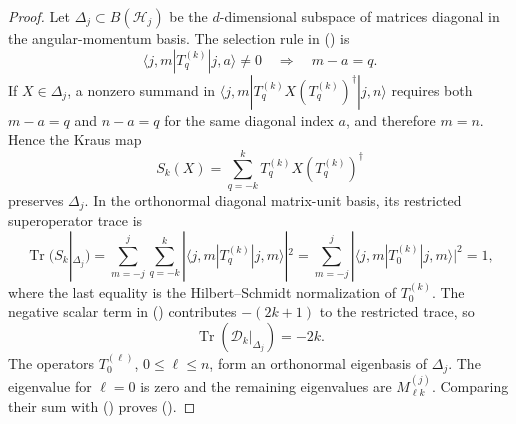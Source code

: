 \documentclass[twoside,10pt]{article}
\numberwithin{equation}{section}
\theoremstyle{slbody}
\theoremstyle{definition}
\theoremstyle{remark}
\newcommand{\Tr}{\operatorname{Tr}}
\newcommand{\cD}{\mathcal D}
\renewcommand{\eqref}[1]{%
  \textup{{\normalfont(\oldstylenums{\ref{#1}}}\normalfont)}}
\begin{document}
\begin{proof}
Let \(\Delta_j\subset B(\mathcal H_j)\) be the \(d\)-dimensional
subspace of matrices diagonal in the angular-momentum basis.  The
selection rule in \eqref{eq:tensor-definition} is
\begin{equation}\label{eq:tensor-selection-rule}
 \langle j,m|T_q^{(k)}|j,a\rangle\ne0
 \quad\Longrightarrow\quad m-a=q.
\end{equation}
If \(X\in\Delta_j\), a nonzero summand in
\(\langle j,m|T_q^{(k)}X(T_q^{(k)})^\dagger|j,n\rangle\)
requires both \(m-a=q\) and \(n-a=q\) for the same diagonal index
\(a\), and therefore \(m=n\).  Hence the Kraus map
\begin{equation*}
 S_k(X)=\sum_{q=-k}^kT_q^{(k)}X(T_q^{(k)})^\dagger
\end{equation*}
preserves \(\Delta_j\).  In the orthonormal diagonal matrix-unit basis,
its restricted superoperator trace is
\begin{equation*}
 \Tr(S_k|_{\Delta_j})
 =\sum_{m=-j}^j\sum_{q=-k}^k
   |\langle j,m|T_q^{(k)}|j,m\rangle|^2
 =\sum_{m=-j}^j|\langle j,m|T_0^{(k)}|j,m\rangle|^2
 =1,
\end{equation*}
where the last equality is the Hilbert--Schmidt normalization of
\(T_0^{(k)}\).  The negative scalar term in
\eqref{eq:dissipator-simplified} contributes \(-(2k+1)\) to the
restricted trace, so
\begin{equation}\label{eq:diagonal-dissipator-trace}
 \Tr(\cD_k|_{\Delta_j})=-2k.
\end{equation}
The operators \(T_0^{(\ell)}\), \(0\leq\ell\leq n\), form an
orthonormal eigenbasis of \(\Delta_j\).  The eigenvalue for \(\ell=0\)
is zero and the remaining eigenvalues are
\(M^{(j)}_{\ell k}\).  Comparing their sum with
\eqref{eq:diagonal-dissipator-trace} proves
\eqref{eq:column-decays}.


\end{proof}
\end{document}
